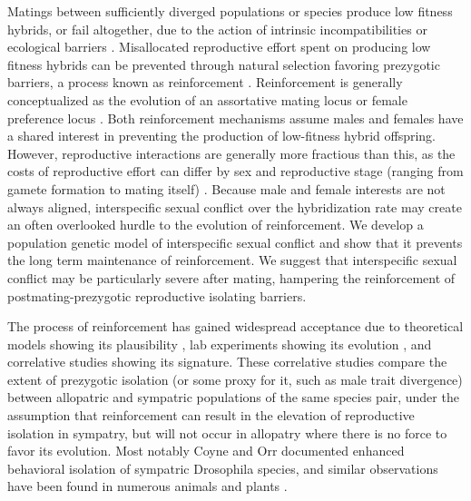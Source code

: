 \documentclass[11pt]{article}
\begin{document}
Matings between sufficiently diverged populations or species produce low fitness hybrids, or fail altogether, due to the action of intrinsic incompatibilities \citep{dobzhansky1937, muller1942} or ecological barriers \citep{schluter1998}. 
Misallocated reproductive effort spent on producing low fitness hybrids can be prevented through natural selection favoring prezygotic barriers, a process known as reinforcement \citep{dobzhansky1937, servedio2003}.
Reinforcement is generally conceptualized as the evolution of an assortative mating locus \citep{felsenstein1981} or female preference locus \citep{servedio1997}.   
Both reinforcement mechanisms assume males and females have a shared interest in preventing the production of low-fitness hybrid offspring. 
However, reproductive interactions are generally more fractious than this, as the costs of reproductive effort can differ by sex and reproductive stage (ranging from gamete formation to mating itself) \citep{arnqvistandrowebook}.  
Because male and female interests are not always aligned, interspecific sexual conflict over the hybridization rate \citep{parker1998}  may create an often overlooked hurdle to the evolution of reinforcement.   
We develop a population genetic model of interspecific sexual conflict and show that it prevents the long term maintenance of reinforcement.  
We suggest that interspecific sexual conflict may be particularly severe after mating, hampering the reinforcement of postmating-prezygotic reproductive isolating barriers.  


The process of reinforcement has gained widespread acceptance due to theoretical models showing its plausibility \citep{Liou1994, servedio1997}, lab experiments showing its evolution \citep{koopman1950, matute2010}, and correlative studies showing its signature.   
These correlative studies compare the extent of prezygotic isolation (or some proxy for it, such as male trait divergence) between allopatric and sympatric populations of the same species pair, under the assumption that reinforcement can result in the elevation of reproductive isolation in sympatry, but will not occur in allopatry where there is no force to favor its evolution. 
Most notably Coyne and Orr  \citeyearpar{coyneandorr1989, coyneandorr1997} documented enhanced behavioral isolation of sympatric Drosophila species, and similar observations have been found in numerous animals \citep[revivewed in ][]{coyneandorrbook} and plants \citep{hopkins2013}.  
\end{document}
